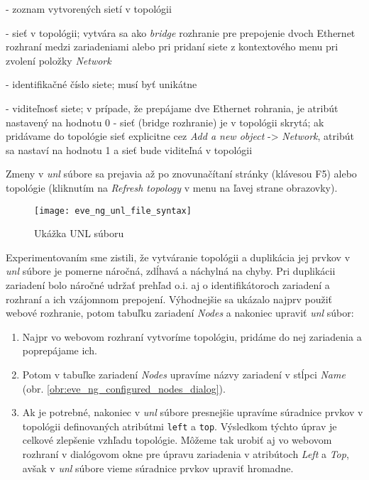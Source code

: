 \begin{enumerate}[noitemsep]
\begin{description}[noitemsep]
        \item [\texttt{<networks>}] - zoznam vytvorených sietí v topológii
        \begin{description}[noitemsep]
            \item [\texttt{<network>}] - sieť v topológii; vytvára sa ako \emph{bridge} rozhranie pre prepojenie dvoch Ethernet rozhraní medzi zariadeniami alebo pri pridaní siete z kontextového menu pri zvolení položky \emph{Network}
            \begin{description}[noitemsep]
                \item [\texttt{id}] - identifikačné číslo siete; musí byť unikátne
                \item [\texttt{visibility}] - viditeľnosť siete; v prípade, že prepájame dve Ethernet rohrania, je atribút nastavený na hodnotu 0 - sieť (bridge rozhranie) je v topológii skrytá; ak pridávame do topológie sieť explicitne cez \emph{Add a new object} -> \emph{Network}, atribút sa nastaví na hodnotu 1 a sieť bude viditeľná v topológii
            \end{description}
        \end{description}
    \end{description}

Zmeny v \emph{unl} súbore sa prejavia až po znovunačítaní stránky (klávesou F5) alebo topológie (kliknutím na \emph{Refresh topology} v menu na ľavej strane obrazovky).

\begin{figure}
    \centering
    \texttt{[image: eve\_ng\_unl\_file\_syntax]}
    \caption{Ukážka UNL súboru}
    \label{obr:eve_ng_unl_file_syntax}
\end{figure}
    
Experimentovaním sme zistili, že vytváranie topológii a duplikácia jej prvkov v \emph{unl} súbore je pomerne náročná, zdĺhavá a náchylná na chyby. Pri duplikácii zariadení bolo náročné udržať prehľad o.i. aj o identifikátoroch zariadení a rozhraní a ich vzájomnom prepojení. Výhodnejšie sa ukázalo najprv použiť webové rozhranie, potom tabuľku zariadení \emph{Nodes} a nakoniec upraviť \emph{unl} súbor:
    
    \begin{enumerate}[noitemsep]
        \item Najpr vo webovom rozhraní vytvoríme topológiu, pridáme do nej zariadenia a poprepájame ich.
        \item Potom v tabuľke zariadení \emph{Nodes} upravíme názvy zariadení v stĺpci \emph{Name} (obr. \ref{obr:eve_ng_configured_nodes_dialog}).
        \item Ak je potrebné, nakoniec v \emph{unl} súbore presnejšie upravíme súradnice prvkov v topológii definovaných atribútmi \texttt{left} a \texttt{top}. Výsledkom týchto úprav je celkové zlepšenie vzhľadu topológie. Môžeme tak urobiť aj vo webovom rozhraní v dialógovom okne pre úpravu zariadenia v atribútoch \emph{Left} a \emph{Top}, avšak v \emph{unl} súbore vieme súradnice prvkov upraviť hromadne.
    \end{enumerate}
    

\end{enumerate}
